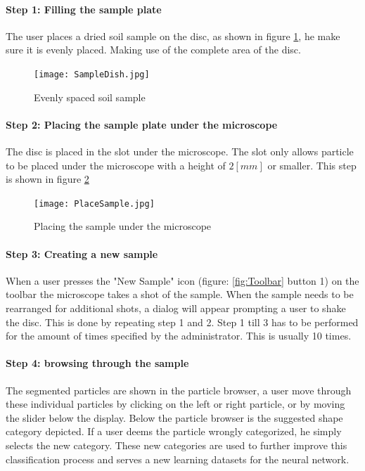 \documentclass[11pt,fleqn,,a4paper,twoside,openright]{book}
\begin{document}
\paragraph{Step 1: Filling the sample plate}
The user places a dried soil sample on the disc, as shown in figure \ref{fig:SampleDish}, he make sure it is evenly placed. Making use of the complete area of the disc. 
\begin{figure}[H]
	\centering
	\texttt{[image: SampleDish.jpg]}
	\caption{Evenly spaced soil sample}\label{fig:SampleDish}
\end{figure}

\newpage
\paragraph{Step 2: Placing the sample plate under the microscope}
The disc is placed in the slot under the microscope. The slot only allows particle to be placed under the microscope  with a height of $ 2 [mm] $ or smaller. This step is shown in figure \ref{fig:PlacementSample}
\begin{figure}[H]
	\centering
	\texttt{[image: PlaceSample.jpg]}
	\caption{Placing the sample under the microscope}\label{fig:PlacementSample}
\end{figure}

\paragraph{Step 3: Creating a new sample}
When a user presses the "New Sample" icon (figure: \ref{fig:Toolbar} button 1) on the toolbar the microscope takes a shot of the sample. When the sample needs to be rearranged for additional shots, a dialog will appear prompting a user to shake the disc. This is done by repeating step 1 and 2. Step 1 till 3 has to be performed for the amount of times specified by the administrator. This is usually 10 times.

\paragraph{Step 4: browsing through the sample}
The segmented particles are shown in the particle browser, a user move through these individual particles by clicking on the left or right particle, or by moving the slider below the display. Below the particle browser is the suggested shape category depicted. If a user deems the particle wrongly categorized, he simply selects the new category. These new categories are used to further improve this classification process and serves a new learning datasets for the neural network.
\end{document}
